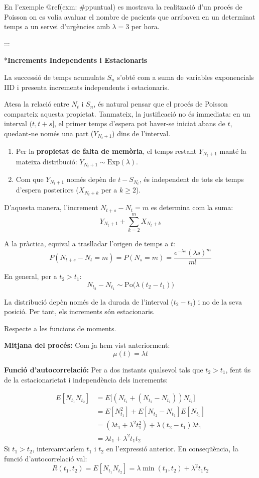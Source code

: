 \documentclass[
  catalan,
]{article}
\providecommand{\tightlist}{%
  \setlength{\itemsep}{0pt}\setlength{\parskip}{0pt}}
\theoremstyle{definition}
\theoremstyle{definition}
\theoremstyle{definition}
\theoremstyle{definition}
\theoremstyle{remark}
\begin{document}
En l'exemple @ref(exm: \#ppuntual) es mostrava la realització d'un procés de Poisson on es volia avaluar el nombre de pacients que arribaven en un determinat temps a un servei d'urgències amb \(\lambda=3\) per hora.

:::

*\textbf{Increments Independents i Estacionaris}

La successió de temps acumulats \(S_n\) s'obté com a suma de variables exponencials IID i presenta increments independents i estacionaris.

Atesa la relació entre \(N_t\) i \(S_n\), és natural pensar que el procés de Poisson comparteix aquesta propietat. Tanmateix, la justificació no és immediata: en un interval \((t, t+s]\), el primer temps d'espera pot haver-se iniciat abans de \(t\), quedant-ne només una part (\(Y_{N_t+1}\)) dins de l'interval.

\begin{enumerate}
\def\labelenumi{\arabic{enumi}.}
\tightlist
\item
  Per la \textbf{propietat de falta de memòria}, el temps restant \(Y_{N_t+1}\) manté la mateixa distribució: \(Y_{N_t+1} \sim \text{Exp}(\lambda)\).
\item
  Com que \(Y_{N_t+1}\) només depèn de \(t - S_{N_t}\), és independent de tots els temps d'espera posteriors (\(X_{N_t+k}\) per a \(k \ge 2\)).
\end{enumerate}

D'aquesta manera, l'increment \(N_{t+s} - N_t = m\) es determina com la suma:
\[Y_{N_t+1} + \sum_{k=2}^{m} X_{N_t+k}\]

A la pràctica, equival a traslladar l'origen de temps a \(t\):
\[P(N_{t+s} - N_t = m) = P(N_s = m) = \frac{e^{-\lambda s} (\lambda s)^m}{m!}\]

En general, per a \(t_2 > t_1\):
\[N_{t_2} - N_{t_1} \sim \text{Po}\big(\lambda(t_2 - t_1)\big)\]

La distribució depèn només de la durada de l'interval (\(t_2 - t_1\)) i no de la seva posició. Per tant, els increments són estacionaris.

Respecte a les funcions de moments.

\textbf{Mitjana del procés:}
Com ja hem vist anteriorment:
\[\mu(t) = \lambda t\]

\textbf{Funció d'autocorrelació:}
Per a dos instants qualsevol tals que \(t_2 > t_1\), fent ús de la estacionarietat i independència dels increments:

\begin{align*}
E[N_{t_1} N_{t_2}] &= E\big[(N_{t_1} + (N_{t_2} - N_{t_1})) N_{t_1}\big] \\
&= E[N_{t_1}^2] + E[N_{t_2} - N_{t_1}] E[N_{t_1}] \\
&= (\lambda t_1 + \lambda^2 t_1^2) + \lambda(t_2 - t_1) \lambda t_1 \\
&= \lambda t_1 + \lambda^2 t_1 t_2
\end{align*}
Si \(t_1 > t_2\), intercanviaríem \(t_1\) i \(t_2\) en l'expressió anterior. En conseqüència, la funció d'autocorrelació val:
\[R(t_1, t_2) = E[N_{t_1} N_{t_2}] = \lambda \min(t_1, t_2) + \lambda^2 t_1 t_2\]
\end{document}
